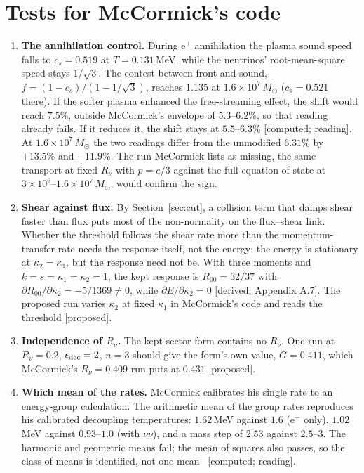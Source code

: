 \documentclass[11pt]{article}
\newcommand{\grade}[1]{\textsf{\small[#1]}}
\begin{document}
\section{Tests for McCormick's code}

\begin{enumerate}
\item \textbf{The annihilation control.} During e$^\pm$ annihilation the plasma sound speed falls to $c_s=0.519$ at $T=0.131$\,MeV, while the neutrinos' root-mean-square speed stays $1/\sqrt3$. The contest between front and sound, $f=(1-c_s)/(1-1/\sqrt3)$, reaches $1.135$ at $1.6\times10^7\,M_\odot$ ($c_s=0.521$ there). If the softer plasma enhanced the free-streaming effect, the shift would reach $7.5\%$, outside McCormick's envelope of $5.3$--$6.2\%$, so that reading already fails. If it reduces it, the shift stays at $5.5$--$6.3\%$ \grade{computed; reading}. At $1.6\times10^7\,M_\odot$ the two readings differ from the unmodified $6.31\%$ by $+13.5\%$ and $-11.9\%$. The run McCormick lists as missing, the same transport at fixed $R_\nu$ with $p=e/3$ against the full equation of state at $3\times10^6$--$1.6\times10^7\,M_\odot$, would confirm the sign.
\item \textbf{Shear against flux.} By Section~\ref{sec:cut}, a collision term that damps shear faster than flux puts most of the non-normality on the flux--shear link. Whether the threshold follows the shear rate more than the momentum-transfer rate needs the response itself, not the energy: the energy is stationary at $\kappa_2=\kappa_1$, but the response need not be. With three moments and $k=s=\kappa_1=\kappa_2=1$, the kept response is $R_{00}=32/37$ with $\partial R_{00}/\partial\kappa_2=-5/1369\neq0$, while $\partial E/\partial\kappa_2=0$ \grade{derived; Appendix A.7}. The proposed run varies $\kappa_2$ at fixed $\kappa_1$ in McCormick's code and reads the threshold \grade{proposed}.
\item \textbf{Independence of $R_\nu$.} The kept-sector form contains no $R_\nu$. One run at $R_\nu=0.2$, $\epsilon_{\rm dec}=2$, $n=3$ should give the form's own value, $G=0.411$, which McCormick's $R_\nu=0.409$ run puts at $0.431$ \grade{proposed}.
\item \textbf{Which mean of the rates.} McCormick calibrates his single rate to an energy-group calculation. The arithmetic mean of the group rates reproduces his calibrated decoupling temperatures: $1.62$\,MeV against $1.6$ (e$^\pm$ only), $1.02$\,MeV against $0.93$--$1.0$ (with $\nu\nu$), and a mass step of $2.53$ against $2.5$--$3$. The harmonic and geometric means fail; the mean of squares also passes, so the class of means is identified, not one mean~\cite{WB} \grade{computed; reading}.
\end{enumerate}
\end{document}
